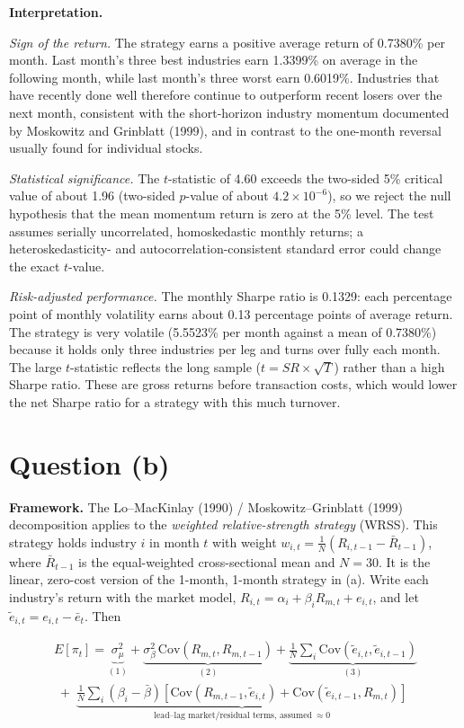 \documentclass[11pt]{article}
\begin{document}
\textbf{Interpretation.}
 
\emph{Sign of the return.} The strategy earns a positive average return of 0.7380\% per month. Last month's three best industries earn 1.3399\% on average in the following month, while last month's three worst earn 0.6019\%. Industries that have recently done well therefore continue to outperform recent losers over the next month, consistent with the short-horizon industry momentum documented by Moskowitz and Grinblatt (1999), and in contrast to the one-month reversal usually found for individual stocks.
 
\emph{Statistical significance.} The $t$-statistic of 4.60 exceeds the two-sided 5\% critical value of about 1.96 (two-sided $p$-value of about $4.2\times10^{-6}$), so we reject the null hypothesis that the mean momentum return is zero at the 5\% level. The test assumes serially uncorrelated, homoskedastic monthly returns; a heteroskedasticity- and autocorrelation-consistent standard error could change the exact $t$-value.
 
\emph{Risk-adjusted performance.} The monthly Sharpe ratio is 0.1329: each percentage point of monthly volatility earns about 0.13 percentage points of average return. The strategy is very volatile (5.5523\% per month against a mean of 0.7380\%) because it holds only three industries per leg and turns over fully each month. The large $t$-statistic reflects the long sample ($t = SR\times\sqrt{T}$) rather than a high Sharpe ratio. These are gross returns before transaction costs, which would lower the net Sharpe ratio for a strategy with this much turnover.
 
\section*{Question (b)}
 
\textbf{Framework.} The Lo–MacKinlay (1990) / Moskowitz–Grinblatt (1999) decomposition applies to the \emph{weighted relative-strength strategy} (WRSS). This strategy holds industry $i$ in month $t$ with weight $w_{i,t}=\frac{1}{N}\left(R_{i,t-1}-\bar R_{t-1}\right)$, where $\bar R_{t-1}$ is the equal-weighted cross-sectional mean and $N=30$. It is the linear, zero-cost version of the 1-month, 1-month strategy in (a). Write each industry's return with the market model, $R_{i,t}=\alpha_i+\beta_i R_{m,t}+e_{i,t}$, and let $\tilde e_{i,t}=e_{i,t}-\bar e_t$. Then
 
\begin{multline*}
E[\pi_t]=\underbrace{\sigma^2_\mu}_{(1)}+\underbrace{\sigma^2_\beta\,\mathrm{Cov}(R_{m,t},R_{m,t-1})}_{(2)}+\underbrace{\tfrac{1}{N}\textstyle\sum_i \mathrm{Cov}(\tilde e_{i,t},\tilde e_{i,t-1})}_{(3)} \\
\;+\;\underbrace{\tfrac{1}{N}\textstyle\sum_i(\beta_i-\bar\beta)\left[\mathrm{Cov}(R_{m,t-1},\tilde e_{i,t})+\mathrm{Cov}(\tilde e_{i,t-1},R_{m,t})\right]}_{\text{lead–lag market/residual terms, assumed}\ \approx 0}
\end{multline*}
 
\end{document}

